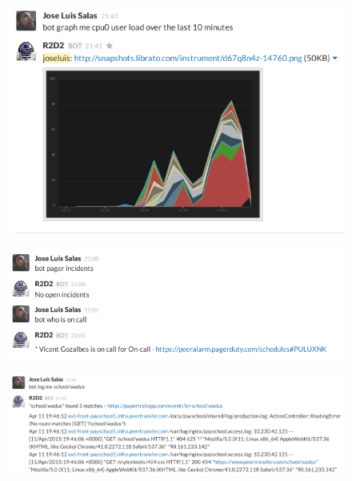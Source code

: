 \documentclass[
paper=128mm:96mm, %
fontsize=11pt, %
pagesize, %
parskip=half-, %
]{scrartcl} %
\theoremstyle{mythmstyle} %
\begin{document}
\clearpage


\begin{figure}[h]
\centering\includegraphics[width=0.8\linewidth]{librato.png}
\end{figure}

\clearpage


\begin{figure}[h]
\centering\includegraphics[width=0.8\linewidth]{pagerduty.png}
\end{figure}

\clearpage


\begin{figure}[h]
\centering\includegraphics[width=1.0\linewidth]{papertrail.png}
\end{figure}

\clearpage
\end{document}

